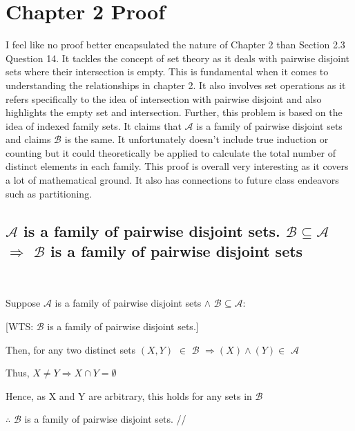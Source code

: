 \documentclass{article}
\begin{document}
\section{Chapter 2 Proof}
\justifying
I feel like no proof better encapsulated the nature of Chapter 2 than Section 2.3 Question 14. It tackles the concept of set theory as it deals with pairwise disjoint sets where their intersection is empty. This is fundamental when it comes to understanding the relationships in chapter 2. It also involves set operations as it refers specifically to the idea of intersection with pairwise disjoint and also highlights the empty set and intersection. Further, this problem is based on the idea of indexed family sets. It claims that \( \mathcal{A} \) is a family of pairwise disjoint sets and claims \( \mathcal{B} \) is the same. It unfortunately doesn't include true induction or counting but it could theoretically be applied to calculate the total number of distinct elements in each family. This proof is overall very interesting as it covers a lot of mathematical ground. It also has connections to future class endeavors such as partitioning.

\begin{center}


\end{center}

\newpage
\subsection{\( \mathcal{A} \) is a family of pairwise disjoint sets. \( \mathcal{B} \subseteq \mathcal{A} \) $\Rightarrow$ \( \mathcal{B} \) is a family of pairwise disjoint sets}
\
\begin{center}
\raggedright
Suppose \( \mathcal{A} \) is a family of pairwise disjoint sets $\wedge$  \( \mathcal{B} \subseteq \mathcal{A} \):

[WTS: \( \mathcal{B} \) is a family of pairwise disjoint sets.]

Then, for any two distinct sets $\left( X,Y \right)$  $\in$ \( \mathcal{B} \) $\Rightarrow \left( X \right)\wedge \left( Y \right) \in$ \( \mathcal{A} \)

Thus, $ X \neq Y \Rightarrow X \cap Y = \emptyset$

Hence, as X and Y are arbitrary, this holds for any sets in \( \mathcal{B} \)

$\therefore$  \( \mathcal{B} \) is a family of pairwise disjoint sets.  //
\end{center}
\newpage
\end{document}
